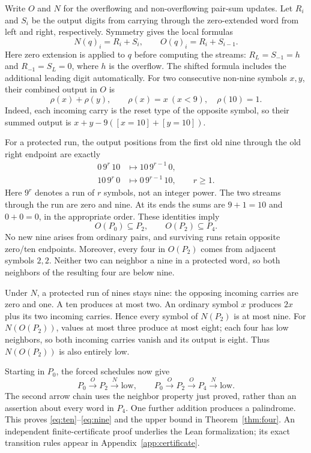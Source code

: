 \documentclass[11pt]{article}
\begin{document}
Write $O$ and $N$ for the overflowing and non-overflowing pair-sum updates.
Let $R_i$ and $S_i$ be the output digits from carrying through the zero-extended
word from left and right, respectively. Symmetry gives the local formulas
\[
 N(q)_i=R_i+S_i,\qquad O(q)_i=R_i+S_{i-1}.
\]
Here zero extension is applied to $q$ before computing the streams:
$R_L=S_{-1}=h$ and $R_{-1}=S_L=0$, where $h$ is the overflow.
The shifted formula includes the additional leading digit automatically.
For two consecutive non-nine symbols $x,y$, their combined output in $O$ is
\[
 \rho(x)+\rho(y),\qquad
 \rho(x)=x\ (x<9),\quad \rho(10)=1.
\]
Indeed, each incoming carry is the reset type of the opposite symbol,
so their summed output is $x+y-9([x=10]+[y=10])$.

For a protected run, the output positions from the first old nine through
the old right endpoint are exactly
\begin{align*}
 0\,9^r\,10&\longmapsto10\,9^{r-1}\,0,\\
 10\,9^r\,0&\longmapsto0\,9^{r-1}\,10,\qquad r\geq1.
\end{align*}
Here $9^r$ denotes a run of $r$ symbols, not an integer power. The two streams
through the run are zero and nine. At its ends the sums are $9+1=10$ and
$0+0=0$, in the appropriate order. These identities imply
\[
 O(P_0)\subseteq P_2,\qquad O(P_2)\subseteq P_4.
\]
No new nine arises from ordinary pairs, and surviving runs retain opposite
zero/ten endpoints. Moreover, every four in $O(P_2)$ comes from adjacent
symbols $2,2$. Neither two can neighbor a nine in a protected word, so both
neighbors of the resulting four are below nine.

Under $N$, a protected run of nines stays nine: the opposing incoming carries
are zero and one. A ten produces at most two. An ordinary symbol $x$ produces
$2x$ plus its two incoming carries. Hence every symbol of $N(P_2)$ is at most
nine. For $N(O(P_2))$, values at most three produce at most eight; each four
has low neighbors, so both incoming carries vanish and its output is eight.
Thus $N(O(P_2))$ is also entirely low.

Starting in $P_0$, the forced schedules now give
\[
 P_0\xrightarrow{O}P_2\xrightarrow{N}\text{low},
 \qquad
 P_0\xrightarrow{O}P_2\xrightarrow{O}P_4
       \xrightarrow{N}\text{low}.
\]
The second arrow chain uses the neighbor property just proved, rather than
an assertion about every word in $P_4$. One further addition produces a
palindrome. This proves \eqref{eq:ten}--\eqref{eq:nine} and the upper bound
in Theorem~\ref{thm:four}. An independent finite-certificate proof underlies
the Lean formalization; its exact transition rules appear in Appendix~\ref{app:certificate}.
\end{document}
